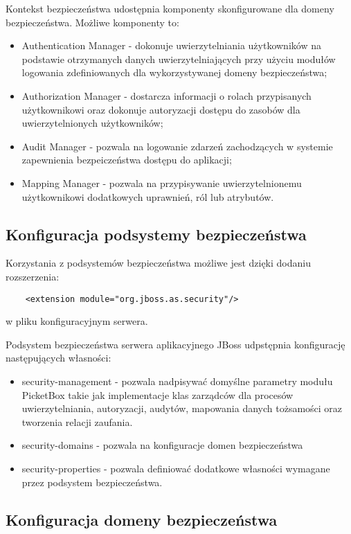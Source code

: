 	Kontekst bezpieczeństwa udostępnia komponenty skonfigurowane dla domeny bezpieczeństwa. Możliwe komponenty to:

	\begin{itemize}
		\item Authentication Manager - dokonuje uwierzytelniania użytkowników na podstawie otrzymanych danych uwierzytelniających przy użyciu modułów logowania zdefiniowanych dla wykorzystywanej domeny bezpieczeństwa;
		\item Authorization Manager - dostarcza informacji o rolach przypisanych użytkownikowi oraz dokonuje autoryzacji dostępu do zasobów dla uwierzytelnionych użytkowników;
		\item Audit Manager - pozwala na logowanie zdarzeń zachodzących w systemie zapewnienia bezpeiczeństwa dostępu do aplikacji;
		\item Mapping Manager - pozwala na przypisywanie uwierzytelnionemu użytkownikowi dodatkowych uprawnień, ról lub atrybutów.
	\end{itemize}

	\subsection{Konfiguracja podsystemy bezpieczeństwa}

		Korzystania z podsystemów bezpieczeństwa możliwe jest dzięki dodaniu rozszerzenia:
		\lstset{language=XML}
		\begin{lstlisting}
	<extension module="org.jboss.as.security"/>
		\end{lstlisting}
		w pliku konfiguracyjnym serwera.

		Podsystem bezpieczeństwa serwera aplikacyjnego JBoss udpstępnia konfigurację następujących własności:

		\begin{itemize}
			\item security-management - pozwala nadpisywać domyślne parametry modułu PicketBox takie jak implementacje klas zarządców dla procesów uwierzytelniania, autoryzacji, audytów, mapowania danych tożsamości oraz tworzenia relacji zaufania.
			\item security-domains - pozwala na konfiguracje domen bezpieczeństwa
			\item security-properties - pozwala definiować dodatkowe własności wymagane przez podsystem bezpieczeństwa.
		\end{itemize}

	\subsection{Konfiguracja domeny bezpieczeństwa}

